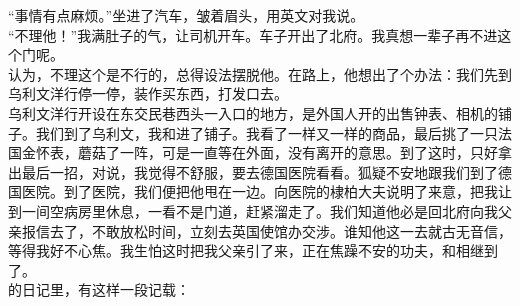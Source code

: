 “事情有点麻烦。”坐进了汽车，皱着眉头，用英文对我说。\\

“不理他！”我满肚子的气，让司机开车。车子开出了北府。我真想一辈子再不进这个门呢。\\

认为，不理这个是不行的，总得设法摆脱他。在路上，他想出了个办法：我们先到乌利文洋行停一停，装作买东西，打发口去。\\

乌利文洋行开设在东交民巷西头一入口的地方，是外国人开的出售钟表、相机的铺子。我们到了乌利文，我和进了铺子。我看了一样又一样的商品，最后挑了一只法国金怀表，蘑菇了一阵，可是一直等在外面，没有离开的意思。到了这时，只好拿出最后一招，对说，我觉得不舒服，要去德国医院看看。狐疑不安地跟我们到了德国医院。到了医院，我们便把他甩在一边。向医院的棣柏大夫说明了来意，把我让到一间空病房里休息，一看不是门道，赶紧溜走了。我们知道他必是回北府向我父亲报信去了，不敢放松时间，立刻去英国使馆办交涉。谁知他这一去就古无音信，等得我好不心焦。我生怕这时把我父亲引了来，正在焦躁不安的功夫，和相继到了。\\

的日记里，有这样一段记载：\\

